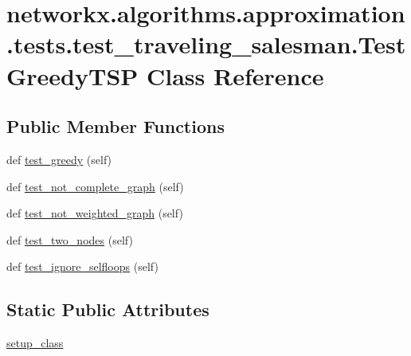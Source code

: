 \hypertarget{classnetworkx_1_1algorithms_1_1approximation_1_1tests_1_1test__traveling__salesman_1_1TestGreedyTSP}{}\section{networkx.\+algorithms.\+approximation.\+tests.\+test\+\_\+traveling\+\_\+salesman.\+Test\+Greedy\+T\+SP Class Reference}
\label{classnetworkx_1_1algorithms_1_1approximation_1_1tests_1_1test__traveling__salesman_1_1TestGreedyTSP}
\subsection*{Public Member Functions}
\begin{DoxyCompactItemize}
\item 
def \hyperlink{classnetworkx_1_1algorithms_1_1approximation_1_1tests_1_1test__traveling__salesman_1_1TestGreedyTSP_ab3dd69c21dc98978782851b0a0612822}{test\+\_\+greedy} (self)
\item 
def \hyperlink{classnetworkx_1_1algorithms_1_1approximation_1_1tests_1_1test__traveling__salesman_1_1TestGreedyTSP_a1d22ad0e1ebceacf652d99a32b972d70}{test\+\_\+not\+\_\+complete\+\_\+graph} (self)
\item 
def \hyperlink{classnetworkx_1_1algorithms_1_1approximation_1_1tests_1_1test__traveling__salesman_1_1TestGreedyTSP_ac9c8fa23d7766bdb41cd96b9b87d62c4}{test\+\_\+not\+\_\+weighted\+\_\+graph} (self)
\item 
def \hyperlink{classnetworkx_1_1algorithms_1_1approximation_1_1tests_1_1test__traveling__salesman_1_1TestGreedyTSP_a2bb2432854867fa8689e2aa333bb0e86}{test\+\_\+two\+\_\+nodes} (self)
\item 
def \hyperlink{classnetworkx_1_1algorithms_1_1approximation_1_1tests_1_1test__traveling__salesman_1_1TestGreedyTSP_acaffa83f594702e191485f56d93c00ea}{test\+\_\+ignore\+\_\+selfloops} (self)
\end{DoxyCompactItemize}
\subsection*{Static Public Attributes}
\begin{DoxyCompactItemize}
\item 
\hyperlink{classnetworkx_1_1algorithms_1_1approximation_1_1tests_1_1test__traveling__salesman_1_1TestGreedyTSP_a968d2f8c1ac57a9b4ff78ab6ff777a1a}{setup\+\_\+class}
\end{DoxyCompactItemize}


